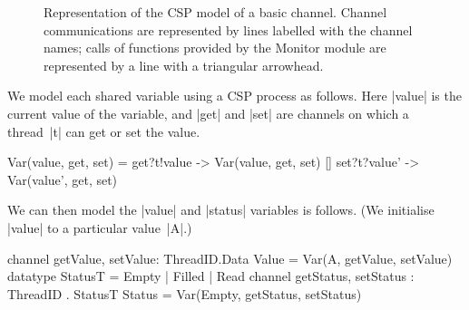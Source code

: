 \begin{figure}
\begin{center}
\def\gap{0.1}
\def\threadW{15mm}
\def\height{8mm}
\end{center}
\caption{Representation of the CSP model of a basic channel.  Channel
  communications are represented by lines labelled with the channel names;
  calls of functions provided by the {\cspmstyle Monitor} module are
  represented by a line with a triangular arrowhead.}
\label{fig:basic-CSP-model}
\end{figure}


We model each shared variable using a CSP process as follows.  Here |value| is
the current value of the variable, and |get| and |set| are channels on which a
thread~|t| can get or set the value.
%
\begin{cspm}
Var(value, get, set) = 
  get?t!value -> Var(value, get, set)
  [] set?t?value' -> Var(value', get, set)
\end{cspm}
%
We can then model the |value| and |status| variables is follows.
(We initialise |value| to a particular value~|A|.)
\begin{cspm}
channel getValue, setValue: ThreadID.Data
Value = Var(A, getValue, setValue) 
datatype StatusT = Empty | Filled | Read
channel getStatus, setStatus : ThreadID . StatusT
Status = Var(Empty, getStatus, setStatus)
\end{cspm}

